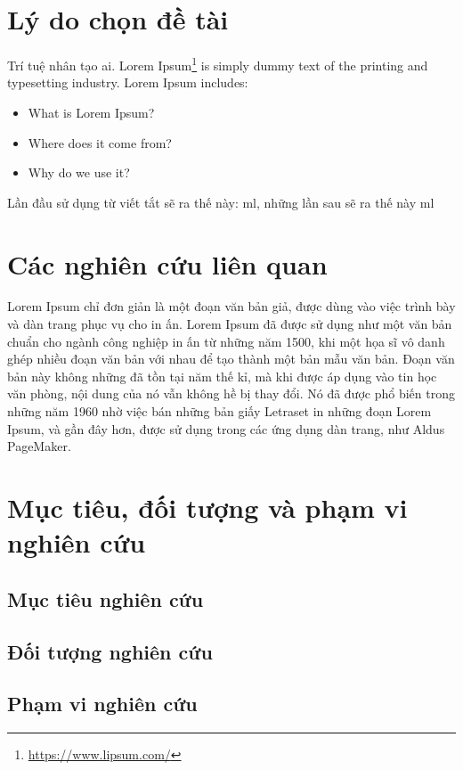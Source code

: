 \section{Lý do chọn đề tài}

Trí tuệ nhân tạo \ac{ai}. Lorem Ipsum\footnote{\url{https://www.lipsum.com/}} is simply dummy text of the printing and typesetting industry\cite{8777334}. Lorem Ipsum includes:
\begin{itemize}
  \item What is Lorem Ipsum?
  \item Where does it come from?
  \item Why do we use it?
\end{itemize}

Lần đầu sử dụng từ viết tắt sẽ ra thế này: \ac{ml}, những lần sau sẽ ra thế này \ac{ml}

\section{Các nghiên cứu liên quan}
Lorem Ipsum chỉ đơn giản là một đoạn văn bản giả, được dùng vào việc trình bày và dàn trang phục vụ cho in ấn. Lorem Ipsum đã được sử dụng như một văn bản chuẩn cho ngành công nghiệp in ấn từ những năm 1500, khi một họa sĩ vô danh ghép nhiều đoạn văn bản với nhau để tạo thành một bản mẫu văn bản. Đoạn văn bản này không những đã tồn tại năm thế kỉ, mà khi được áp dụng vào tin học văn phòng, nội dung của nó vẫn không hề bị thay đổi. Nó đã được phổ biến trong những năm 1960 nhờ việc bán những bản giấy Letraset in những đoạn Lorem Ipsum, và gần đây hơn, được sử dụng trong các ứng dụng dàn trang, như Aldus PageMaker.


\section{Mục tiêu, đối tượng và phạm vi nghiên cứu}
\subsection{Mục tiêu nghiên cứu}
\label{sec:MucTieu}

\subsection{Đối tượng nghiên cứu}
\label{sec:DoiTuong}

\subsection{Phạm vi nghiên cứu}
\label{sec:PhamVi}

